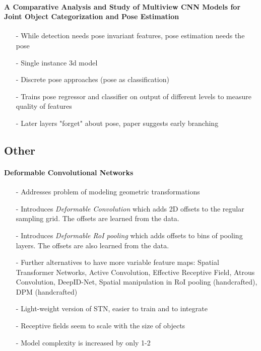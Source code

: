 	 	\paragraph{A Comparative Analysis and Study of Multiview CNN Models for Joint Object Categorization and Pose Estimation\cite{Elhoseiny}}
	 	\begin{itemize}
	 		\item[-] While detection needs pose invariant features, pose estimation needs the pose
		 	\item[-] Single instance 3d model
		 	\item[-] Discrete pose approaches (pose as classification)
		 	\item[-] Trains pose regressor and classifier on output of different levels to measure quality of features
		 	\item[-] Later layers "forget" about pose, paper suggests early branching
	 	\end{itemize}
	\subsection{Other}
		 \paragraph{Deformable Convolutional Networks \cite{Dai}}
		 \begin{itemize}
		 	\item[-] Addresses problem of modeling geometric transformations
		 	\item[-] Introduces \textit{Deformable Convolution} which adds 2D offsets to the regular sampling grid. The offsets are learned from the data.
		 	\item[-] Introduces \textit{Deformable RoI pooling} which adds offsets to bins of pooling layers. The offsets are also learned from the data.
		 	\item[-] Further alternatives to have more variable feature maps: Spatial Transformer Networks, Active Convolution, Effective Receptive Field, Atrous Convolution, DeepID-Net, Spatial manipulation in RoI pooling (handcrafted), DPM (handcrafted)
		 	\item[-] Light-weight version of STN, easier to train and to integrate
		 	\item[-] Receptive fields seem to scale with the size of objects
		 	\item[-] Model complexity is increased by only 1-2%
		 	\end{itemize}


